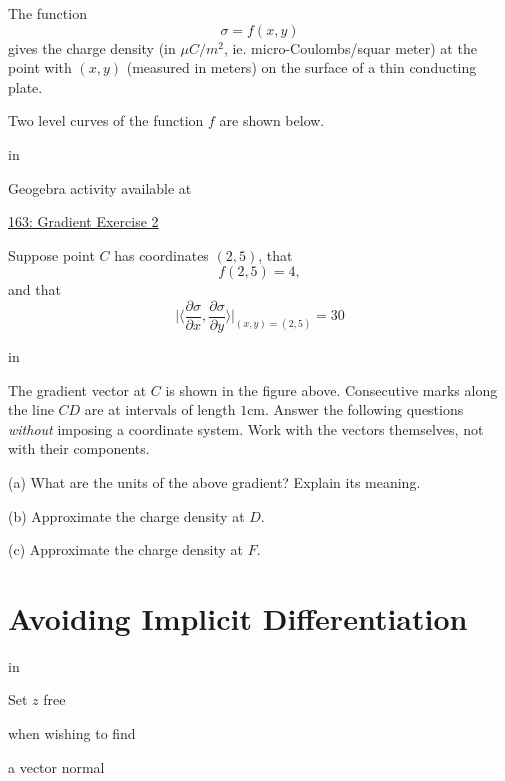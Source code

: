 \documentclass{ximera}
\newcommand{\pskip}{\vskip 0.1 in}
\begin{document}
\begin{question} \label{Q34gvbty}
The function 
\[
 \sigma = f(x,y)
\]
gives the charge density (in $\mu C/m^2$, ie. micro-Coulombs/squar meter) at the point with $(x,y)$ (measured in meters) on the surface of a thin conducting plate.

Two level curves of the function $f$ are shown below.

\pskip

 
\begin{onlineOnly}
    \begin{center}
\end{center}
\end{onlineOnly}

Geogebra activity available at

\href{https://www.geogebra.org/classic/xnqmhyvd}{163: Gradient Exercise 2}


Suppose point $C$ has coordinates $(2,5)$, that
\[
    f(2,5) = 4,
\]
and that
\[
    \Big|  \langle \frac{\partial \sigma}{\partial x}, \frac{\partial \sigma}{\partial y} \rangle \Big|_{(x,y) =(2,5)} = 30
\]

\pskip

The gradient vector at $C$ is shown in the figure above. Consecutive marks along the line $CD$ are at intervals of length $1$cm. Answer the following questions \emph{without} imposing a coordinate system. Work with the vectors themselves, not with their components.

(a) What are the units of the above gradient? Explain its meaning.

(b) Approximate the charge density at $D$.

(c) Approximate the charge density at $F$.



\end{question}


\section{Avoiding Implicit Differentiation}

\pskip

Set $z$ free

when wishing to find

a vector normal
\end{document}
